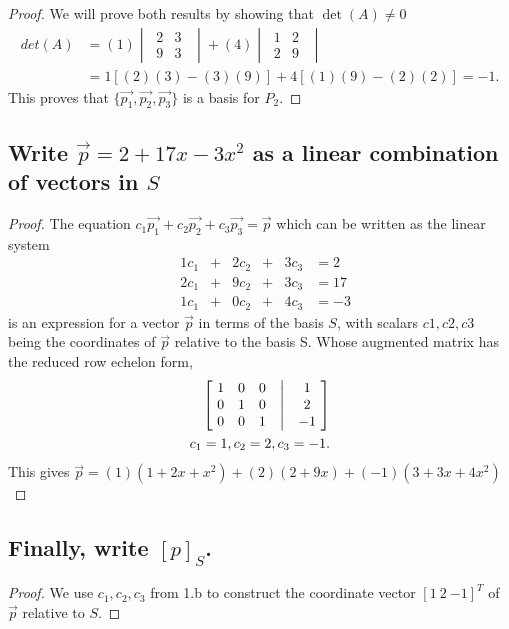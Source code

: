 \documentclass[../main.tex]{subfiles}
\begin{document}
\begin{proof}
  We will prove both results by showing that $\det(A) \neq 0$
  \begin{align*}
    det(A) & = (1)
    \begin{vmatrix}
      \ 2 & 3 \   \\
      \ 9 & 3 \ \
    \end{vmatrix}
    + (4)
    \begin{vmatrix}
      \ 1 & 2 \   \\
      \ 2 & 9 \ \
    \end{vmatrix}                            \\
           & = 1[(2)(3)-(3)(9)] + 4[(1)(9)-(2)(2)] = -1.
  \end{align*}
  This proves that $\{\vec{p_{1}}, \vec{p_{2}}, \vec{p_{3}}\}$ is a basis for $P_2$.
\end{proof}
\pagebreak
\subsection{Write $\vec{p} = 2 + 17x - 3x^2$ as a linear combination of vectors in $S$}
\begin{proof}
  The equation $c_{1}\vec{p_{1}} + c_{2}\vec{p_{2}} + c_{3}\vec{p_{3}} = \vec{p}$ which can be written as the linear system
  $$
    \begin{matrix}
       & 1c_{1} & + & 2c_{2} & + & 3c_{3} & = 2  \\
       & 2c_{1} & + & 9c_{2} & + & 3c_{3} & = 17 \\
       & 1c_{1} & + & 0c_{2} & + & 4c_{3} & = -3
    \end{matrix}
  $$
  is an expression for a vector $\vec{p}$ in terms of the basis $S$, with scalars $c1, c2, c3$
  being the coordinates of $\vec{p}$ relative to the basis S. Whose augmented matrix has the reduced row echelon form,
  \begin{align*}
    \begin{bmatrix}
      \ 1 & 0 & 0 & \bigm| & 1  \ \\
      \ 0 & 1 & 0 & \bigm| & 2  \ \\
      \ 0 & 0 & 1 & \bigm| & -1 \
    \end{bmatrix} \\
    c_{1} = 1, c_{2} = 2, c_{3} = -1.
  \end{align*}
  This gives $\vec{p} = (1)(1+2x+x^2) + (2)(2 + 9x) + (-1)(3 + 3x + 4x^2)$
\end{proof}
\subsection{Finally, write $[p]_S$.}
\begin{proof}
  We use $c_{1}, c_{2}, c_{3}$ from 1.b to construct the coordinate vector $[1\ 2\ {-1}]^{T}$ of $\vec{p}$ relative to $S$.
\end{proof}
\end{document}

